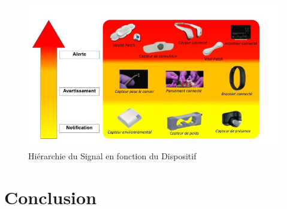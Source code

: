 \documentclass{article}
\begin{document}
\begin{figure}[h!]
	\hspace*{-2.5cm}
	\centering
	\includegraphics[width=1.5\textwidth]{Figure4.jpg}
	\caption{Hiérarchie du Signal en fonction du Dispositif}
	\label{fig:balance}
\end{figure}


\section{ Conclusion }
 







\end{document}
